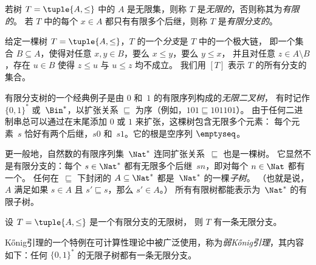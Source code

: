 \documentclass[../../../include/open-logic-section]{subfiles}
\begin{document}
\begin{defn}
若树 $T = \tuple{A, \le}$ 中的 $A$ 是无限集，则称 $T$ 是\emph{无限的}，否则称其为\emph{有限的}。
若 $T$ 中的每个 $x \in A$ 都只有有限多个后继，则称 $T$ 是\emph{有限分支的}。
\end{defn}

\begin{defn}[分支]
给定一棵树 $T = \tuple{A, \le}$，$T$ 的一个\emph{分支}是 $T$ 中的一个极大链，
即一个集合 $B \subseteq A$，使得对任意 $x, y \in B$，要么 $x \le y$，要么 $y \le x$，
并且对任意 $z \in A \setminus B$，存在 $u \in B$ 使得 $z \le u$ 与 $u \le z$ 均不成立。
%
我们用 $[T]$ 表示 $T$ 的所有分支的集合。
\end{defn}

\begin{ex}
有限分支树的一个经典例子是由 $0$ 和~$1$ 的有限序列构成的\emph{无限二叉树}，
有时记作 $\{0,1\}^*$ 或~$\Bin^*$，以扩张关系 $\sqsubseteq$ 为序（例如，$101 \sqsubseteq 101101$）。
由于任何二进制串总可以通过在末尾添加 $0$ 或 $1$ 来扩张，这棵树包含无限多个元素：
每个元素~$s$ 恰好有两个后继，$s0$ 和~$s1$。它的根是空序列 $\emptyseq$。
\end{ex}

\begin{ex}
更一般地，自然数的有限序列集~$\Nat^*$ 连同扩张关系~$\sqsubseteq$ 也是一棵树。
它显然不是有限分支的：每个 $s \in \Nat^*$ 都有无限多个后继~$sn$，即对每个 $n \in \Nat$ 都有一个。
任何在~$\sqsubseteq$ 下封闭的 $A \subseteq \Nat^*$ 都是~$\Nat^*$ 的一棵\emph{子树}。
（也就是说，$A$ 满足如果 $s \in A$ 且 $s' \sqsubseteq s$，那么 $s' \in A$。）
所有有限树都能表示为~$\Nat^*$ 的有限子树。
\end{ex}

\begin{prop}[K\H{o}nig引理]
设 $T = \tuple{A,\le}$ 是一个有限分支的无限树，
则 $T$ 有一条无限分支。
\end{prop}

K\H{o}nig引理的一个特例在可计算性理论中被广泛使用，称为\emph{弱K\H{o}nig引理}，其内容如下：任何 $\{0,1\}^*$ 的无限子树都有一条无限分支。
\end{document}

